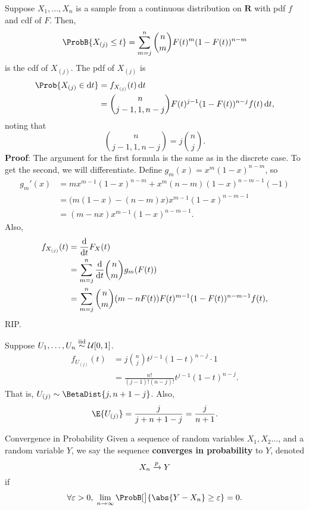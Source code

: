 \begin{Theorem}{}{}
    Suppose $ X_1,\ldots,X_n $ is a sample from a continuous
    distribution on $ \mathbf{R} $ with pdf $ f $
    and cdf of $ F $. Then,
    \[ \ProbB{X_{(j)}\le t}=
        \sum_{m=j}^{n}\binom{n}{m}F(t)^m(1-F(t))^{n-m} \]
    is the cdf of $ X_{(j)} $. The pdf of $ X_{(j)} $
    is
    \begin{align*}
        \Prob{X_{(j)}\in\odif{t}}
         & =f_{X_{(j)}}(t)\odif{t}                                    \\
         & =\binom{n}{j-1,1,n-j}F(t)^{j-1}(1-F(t))^{n-j}f(t)\odif{t},
    \end{align*}
    noting that
    \[ \binom{n}{j-1,1,n-j}=j\binom{n}{j}. \]
    \tcblower{}
    \textbf{Proof}: The argument for the first formula is the same as in the discrete case.
    To get the second, we will differentiate. Define $ g_m(x)=x^m(1-x)^{n-m} $, so
    \begin{align*}
        g_m'(x)
         & =mx^{m-1}(1-x)^{n-m}+x^m(n-m)(1-x)^{n-m-1}(-1) \\
         & =\bigl(m(1-x)-(n-m)x\bigr)x^{m-1}(1-x)^{n-m-1} \\
         & =(m-nx)x^{m-1}(1-x)^{n-m-1}.
    \end{align*}
    Also,
    \begin{align*}
        f_{X_{(j)}}(t)
         & =\odv*{F_X(t)}{t}                               \\
         & =\sum_{m=j}^{n}\odv*{\binom{n}{m}g_m (F(t))}{t} \\
         & =\sum_{m=j}^{n}\binom{n}{m}(m-n F(t))F(t)^{m-1}
        (1-F(t))^{n-m-1}f(t),
    \end{align*}
    RIP\@.
\end{Theorem}
\begin{Example}{}{}
    Suppose $ U_1,\ldots,U_n\overset{\text{iid}}{\sim} \mathcal{U}[0,1] $.
    \begin{align*}
        f_{U_{(j)}}(t)
         & =j\binom{n}{j}t^{j-1}(1-t)^{n-j}\cdot 1     \\
         & =\frac{n!}{(j-1)!(n-j)!}t^{j-1}(1-t)^{n-j}.
    \end{align*}
    That is, $ U_{(j)}\sim \BetaDist{j,n+1-j} $. Also,
    \[ \E{U_{(j)}}=\frac{j}{j+n+1-j}=\frac{j}{n+1}. \]
\end{Example}
\begin{Definition}{Convergence in Probability}{}
    Given a sequence of random variables $ X_1,X_2\ldots $,
    and a random variable $ Y $, we say the sequence
    \textbf{converges in probability} to $ Y $, denoted
    \[ X_n\xrightarrow[]{p} Y \]
    if
    \[ \forall \varepsilon>0,\;
        \lim\limits_{{n} \to {\infty}}\ProbB[\big]{\abs{Y-X_n}\ge \varepsilon}=0. \]
\end{Definition}
